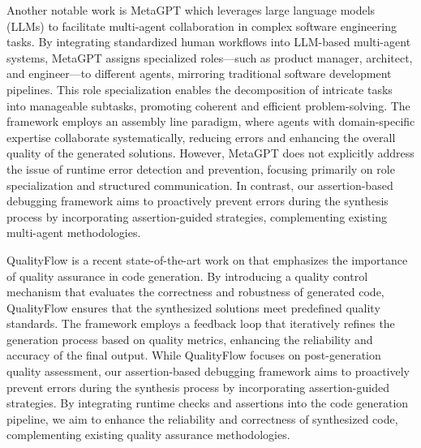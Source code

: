 Another notable work is MetaGPT \cite{MetaGPT} which leverages large language models (LLMs) to facilitate multi-agent collaboration in complex software engineering tasks. By integrating standardized human workflows into LLM-based multi-agent systems, MetaGPT assigns specialized roles—such as product manager, architect, and engineer—to different agents, mirroring traditional software development pipelines. This role specialization enables the decomposition of intricate tasks into manageable subtasks, promoting coherent and efficient problem-solving. The framework employs an assembly line paradigm, where agents with domain-specific expertise collaborate systematically, reducing errors and enhancing the overall quality of the generated solutions. However, MetaGPT does not explicitly address the issue of runtime error detection and prevention, focusing primarily on role specialization and structured communication. In contrast, our assertion-based debugging framework aims to proactively prevent errors during the synthesis process by incorporating assertion-guided strategies, complementing existing multi-agent methodologies.

QualityFlow \cite{QualityFlow} is a recent state-of-the-art work on \cite{PaperWithCode} that emphasizes the importance of quality assurance in code generation. By introducing a quality control mechanism that evaluates the correctness and robustness of generated code, QualityFlow ensures that the synthesized solutions meet predefined quality standards. The framework employs a feedback loop that iteratively refines the generation process based on quality metrics, enhancing the reliability and accuracy of the final output. While QualityFlow focuses on post-generation quality assessment, our assertion-based debugging framework aims to proactively prevent errors during the synthesis process by incorporating assertion-guided strategies. By integrating runtime checks and assertions into the code generation pipeline, we aim to enhance the reliability and correctness of synthesized code, complementing existing quality assurance methodologies.
